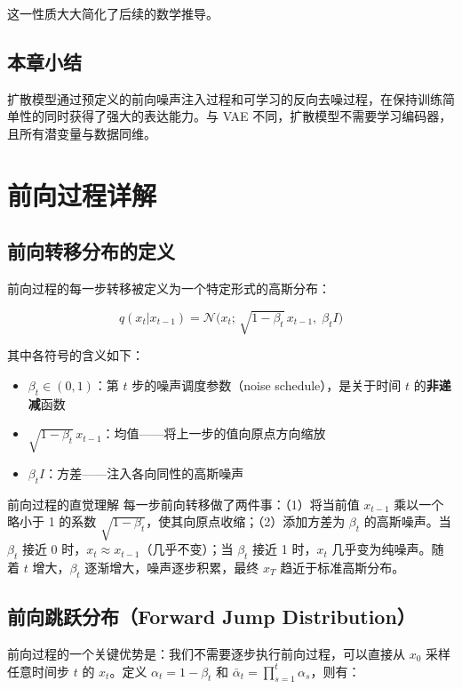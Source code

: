 \documentclass[a4paper]{article}
\begin{document}
这一性质大大简化了后续的数学推导。

\subsection{本章小结}

扩散模型通过预定义的前向噪声注入过程和可学习的反向去噪过程，在保持训练简单性的同时获得了强大的表达能力。与 VAE 不同，扩散模型不需要学习编码器，且所有潜变量与数据同维。


\section{前向过程详解}

\subsection{前向转移分布的定义}

前向过程的每一步转移被定义为一个特定形式的高斯分布：

$$q(x_t | x_{t-1}) = \mathcal{N}\big(x_t;\, \sqrt{1 - \beta_t}\, x_{t-1},\; \beta_t I\big)$$

其中各符号的含义如下：
\begin{itemize}
    \item $\beta_t \in (0, 1)$：第 $t$ 步的噪声调度参数（noise schedule），是关于时间 $t$ 的\textbf{非递减}函数
    \item $\sqrt{1 - \beta_t}\, x_{t-1}$：均值——将上一步的值向原点方向缩放
    \item $\beta_t I$：方差——注入各向同性的高斯噪声
\end{itemize}

\begin{importantbox}{前向过程的直觉理解}
每一步前向转移做了两件事：（1）将当前值 $x_{t-1}$ 乘以一个略小于 1 的系数 $\sqrt{1-\beta_t}$，使其向原点收缩；（2）添加方差为 $\beta_t$ 的高斯噪声。当 $\beta_t$ 接近 0 时，$x_t \approx x_{t-1}$（几乎不变）；当 $\beta_t$ 接近 1 时，$x_t$ 几乎变为纯噪声。随着 $t$ 增大，$\beta_t$ 逐渐增大，噪声逐步积累，最终 $x_T$ 趋近于标准高斯分布。
\end{importantbox}

\subsection{前向跳跃分布（Forward Jump Distribution）}

前向过程的一个关键优势是：我们不需要逐步执行前向过程，可以直接从 $x_0$ 采样任意时间步 $t$ 的 $x_t$。定义 $\alpha_t = 1 - \beta_t$ 和 $\bar{\alpha}_t = \prod_{s=1}^{t} \alpha_s$，则有：
\end{document}
